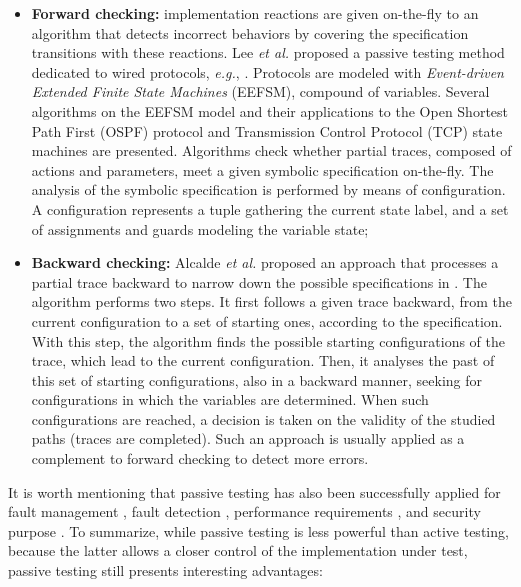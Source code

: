 \begin{itemize}
    \item \textbf{Forward checking:} implementation reactions are
        given on-the-fly to an algorithm that detects incorrect
        behaviors by covering the specification transitions with
        these reactions. Lee \emph{et al.} proposed a passive
        testing method dedicated to wired protocols, \emph{e.g.},
        \cite{1621118}. Protocols are modeled with
        \textit{Event-driven Extended Finite State Machines}
        (EEFSM), compound of variables.  Several algorithms on
        the EEFSM model and their applications to the Open
        Shortest Path First (OSPF) protocol and Transmission
        Control Protocol (TCP) state machines are presented.
        Algorithms check whether partial traces, composed of
        actions and parameters, meet a given symbolic
        specification on-the-fly. The analysis of the symbolic
        specification is performed by means of configuration. A
        configuration represents a tuple gathering the current
        state label, and a set of assignments and guards modeling
        the variable state;

    \item \textbf{Backward checking:} Alcalde \emph{et al.}
        proposed an approach that processes a partial trace
        backward to narrow down the possible specifications in
        \cite{alcalde2004network}. The algorithm performs two
        steps. It first follows a given trace backward, from the
        current configuration to a set of starting ones,
        according to the specification. With this step, the
        algorithm finds the possible starting configurations of
        the trace, which lead to the current configuration. Then,
        it analyses the past of this set of starting
        configurations, also in a backward manner, seeking for
        configurations in which the variables are determined.
        When such configurations are reached, a decision is taken
        on the validity of the studied paths (traces are
        completed). Such an approach is usually applied as a
        complement to forward checking to detect more errors.
\end{itemize}

It is worth mentioning that passive testing has also been
successfully applied for fault management \cite{965909}, fault
detection \cite{Ural:2007:IAP:1270230.1270259}, performance
requirements \cite{che2013passive}, and security
purpose \cite{4698175}. To summarize, while passive testing is
less powerful than active testing, because the latter allows a
closer control of the implementation under test, passive testing
still presents interesting advantages:

